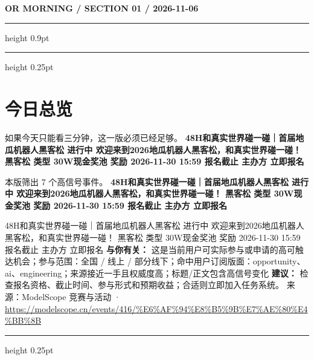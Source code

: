 \documentclass[10.5pt]{ctexart}
\begin{document}
{\small\bfseries OR MORNING / SECTION 01 / 2026-11-06}
\vspace{2mm}
\hrule height 0.9pt
\vspace{1.5mm}
\hrule height 0.25pt
\vspace{4mm}
\section*{今日总览}
{\color{ormuted} 如果今天只能看三分钟，这一版必须已经足够。}
\vspace{2mm}
{\fontsize{25}{29}\selectfont\bfseries 48H和真实世界碰一碰｜首届地瓜机器人黑客松 进行中 欢迎来到2026地瓜机器人黑客松，和真实世界碰一碰！ 黑客松 类型 30W现金奖池 奖励 2026-11-30 15:59 报名截止 主办方 立即报名}\par
\vspace{2mm}
{\large 本版筛出 7 个高信号事件。}
\vspace{3mm}
{\Large\bfseries 48H和真实世界碰一碰｜首届地瓜机器人黑客松 进行中 欢迎来到2026地瓜机器人黑客松，和真实世界碰一碰！ 黑客松 类型 30W现金奖池 奖励 2026-11-30 15:59 报名截止 主办方 立即报名}\par
48H和真实世界碰一碰｜首届地瓜机器人黑客松 进行中 欢迎来到2026地瓜机器人黑客松，和真实世界碰一碰！ 黑客松 类型 30W现金奖池 奖励 2026-11-30 15:59 报名截止 主办方 立即报名
\textbf{与你有关：} 这是当前用户可实际参与或申请的高可触达机会；参与范围：全国 / 线上 / 部分线下；命中用户订阅版面：opportunity、ai、engineering；来源接近一手且权威度高；标题/正文包含高信号变化
\textbf{建议：} 检查报名资格、截止时间、参与形式和预期收益；合适则立即加入任务系统。
{\footnotesize\color{ormuted} 来源：ModelScope 竞赛与活动 · \url{https://modelscope.cn/events/416/%E6%AF%94%E8%B5%9B%E7%AE%80%E4%BB%8B}}
\vspace{3mm}
\hrule height 0.25pt
\vspace{3mm}
\end{document}
